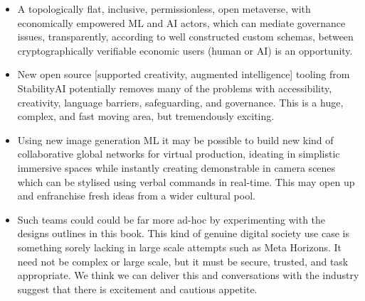 \begin{itemize}
\item A topologically flat, inclusive, permissionless, open metaverse, with economically empowered ML and AI actors, which can mediate governance issues, transparently, according to well constructed custom schemas, between cryptographically verifiable economic users (human or AI) is an opportunity.
\item New open source [supported creativity, augmented intelligence] tooling from StabilityAI potentially removes many of the problems with accessibility, creativity, language barriers, safeguarding, and governance. This is a huge, complex, and fast moving area, but tremendously exciting. 
\item Using new image generation ML it may be possible to build new kind of collaborative global networks for virtual production, ideating in simplistic immersive spaces while instantly creating demonstrable in camera scenes which can be stylised using verbal commands in real-time. This may open up and enfranchise fresh ideas from a wider cultural pool.
\item Such teams could could be far more ad-hoc by experimenting with the designs outlines in this book. This kind of genuine digital society use case is something sorely lacking in large scale attempts such as Meta Horizons. It need not be complex or large scale, but it must be secure, trusted, and task appropriate. We think we can deliver this and conversations with the industry suggest that there is excitement and cautious appetite. 
\end{itemize}


